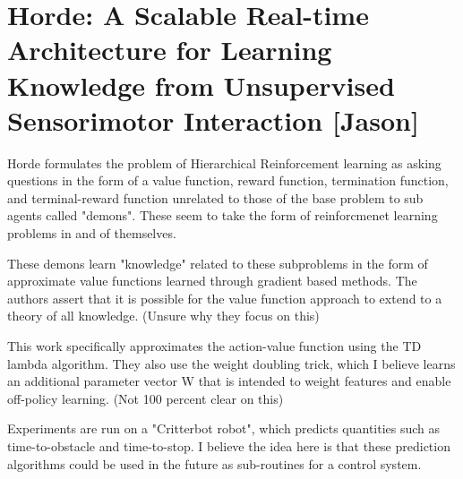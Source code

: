 \section{Horde: A Scalable Real-time Architecture for Learning Knowledge from Unsupervised Sensorimotor Interaction [Jason]}

Horde formulates the problem of Hierarchical Reinforcement learning as asking questions
in the form of a value function, reward function, termination function, and terminal-reward function
unrelated to those of the base problem to sub agents called "demons". These seem to take the
form of reinforcmenet learning problems in and of themselves.

These demons learn "knowledge" related to these subproblems in the form of approximate value
functions learned through gradient based methods. The authors assert that it is possible
for the value function approach to extend to a theory of all knowledge. (Unsure why they focus on this)

This work specifically approximates the action-value function using the TD lambda algorithm.
They also use the weight doubling trick, which I believe learns an additional parameter vector W
that is intended to weight features and enable off-policy learning. (Not 100 percent clear on this)

Experiments are run on a "Critterbot robot", which predicts quantities such as time-to-obstacle and
time-to-stop. I believe the idea here is that these prediction algorithms could be used in the future
as sub-routines for a control system.
